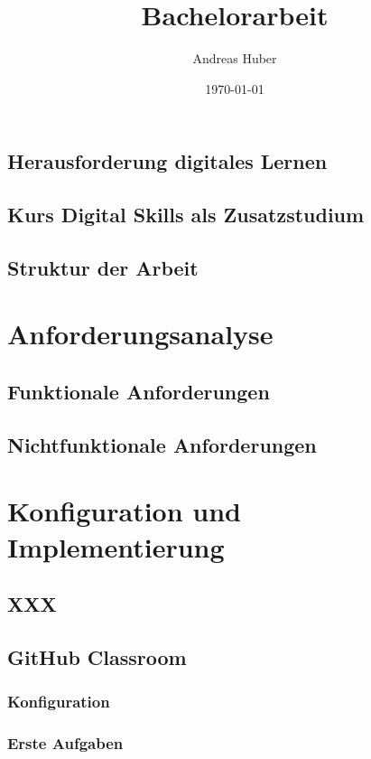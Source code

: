 \documentclass[a4paper,12pt]{article}
\title{Bachelorarbeit}
\author{Andreas Huber}
\date{\today}
\begin{document}

\newpage


\tableofcontents
\newpage



\subsection{Herausforderung digitales Lernen}
\subsection{Kurs Digital Skills als Zusatzstudium}
\subsection{Struktur der Arbeit}

\section{Anforderungsanalyse}
\subsection{Funktionale Anforderungen}
\subsection{Nichtfunktionale Anforderungen}



\section{Konfiguration und Implementierung}
\subsection{XXX}
\subsection{GitHub Classroom}
\subsubsection{Konfiguration}
\subsubsection{Erste Aufgaben}
\end{document}
